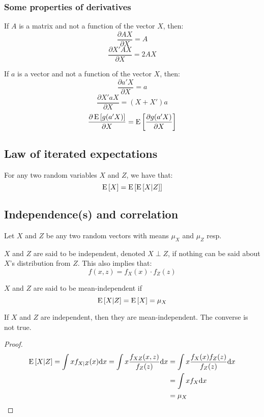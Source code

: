 \subsubsection{Some properties of derivatives}

If $A$ is a matrix and not a function of the vector $X$, then: $$ \frac{\partial AX}{\partial X} = A $$ $$ \frac{\partial X'AX}{\partial X} = 2AX $$

If $a$ is a vector and not a function of the vector $X$, then:
$$\frac{\partial a'X}{\partial X} = a $$
$$\frac{\partial X'aX}{\partial X} = (X+X')a $$
$$ \frac{\partial \operatorname{E}\left[g(a'X)\right]}{\partial X} = \operatorname{E}\left[\frac{\partial g(a'X)}{\partial X}\right] $$

\subsection{Law of iterated expectations}

For any two random variables $X$ and $Z$, we have that: $$\operatorname{E}\left[X\right] = \operatorname{E}\left[\operatorname{E}\left[X|Z\right]\right] $$

\subsection{Independence(s) and correlation}

Let $X$ and $Z$ be any two random vectors with means $\mu_X$ and $\mu_Z$ resp.

\begin{definition}[Independence]
$X$ and $Z$ are said to be independent, denoted $X \perp Z$, if nothing can be said about $X$'s distribution from $Z$. This also implies that: $$f(x, z) = f_X(x)\cdot f_Z(z) $$
\end{definition}

\begin{definition}
$X$ and $Z$ are said to be mean-independent if $$\operatorname{E}\left[X|Z\right] = \operatorname{E}\left[X\right] = \mu_X $$
\end{definition}

\begin{proposition}
If $X$ and $Z$ are independent, then they are mean-independent. The converse is not true.
\end{proposition}
\begin{proof}
\begin{align*}
\operatorname{E}\left[X|Z\right] = \int xf_{X|Z}(x) \mathrm{d} x = \int x\frac{f_{XZ}(x, z)}{f_Z(z)} \mathrm{d} x & = \int x\frac{f_{X}(x)f_{Z}(z)}{f_Z(z)} \mathrm{d} x \\ & = \int x f_{X} \mathrm{d} x \\ &  = \mu_X
\end{align*}
\end{proof}

